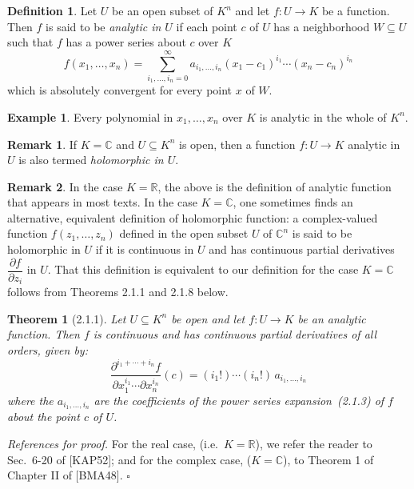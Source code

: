 \documentclass[11pt]{article}
\theoremstyle{plain}
\newtheorem*{theorem*}{Theorem}
\theoremstyle{definition}
\newtheorem*{definition}{Definition}
\newtheorem*{example}{Example}
\newtheorem*{remark}{Remark}
\newcommand{\R}{\mathbb{R}}
\newcommand{\C}{\mathbb{C}}
\begin{document}
\begin{definition}
Let $U$ be an open subset of $K^n$ and let $f: U \to K$ be a function.
Then $f$ is said to be \emph{analytic in $U$} if each point $c$ of $U$
has a neighborhood $W \subseteq U$ such that $f$ has a power series
about $c$ over $K$
\begin{equation}
f(x_1, \ldots, x_n) = \sum_{i_1, \ldots, i_n = 0}^{\infty}
a_{i_1, \ldots, i_n} (x_1 - c_1)^{i_1} \cdots (x_n - c_n)^{i_n}
\tag{2.1.3}
\end{equation}
which is absolutely convergent for every point $x$ of $W$.
\end{definition}

\begin{example}
Every polynomial in $x_1, \ldots, x_n$ over $K$ is analytic in the whole
of $K^n$.
\end{example}

\begin{remark}
If $K = \C$ and $U \subseteq K^n$ is open, then a function $f: U \to K$
analytic in $U$ is also termed \emph{holomorphic in $U$}.
\end{remark}

\begin{remark}
In the case $K = \R$, the above is the definition of analytic function
that appears in most texts. In the case $K = \C$, one sometimes finds an
alternative, equivalent definition of holomorphic function: a
complex-valued function $f(z_1, \ldots, z_n)$ defined in the open subset
$U$ of $\C^n$ is said to be holomorphic in $U$ if it is continuous in $U$
and has continuous partial derivatives $\dfrac{\partial f}{\partial z_i}$
in $U$. That this definition is equivalent to our definition for the
case $K = \C$ follows from Theorems 2.1.1 and 2.1.8 below.
\end{remark}

\begin{theorem*}[2.1.1]
Let $U \subseteq K^n$ be open and let $f: U \to K$ be an analytic
function. Then $f$ is continuous and has continuous partial derivatives
of all orders, given by:
\[
\frac{\partial^{i_1 + \cdots + i_n} f}
{\partial x_1^{i_1} \cdots \partial x_n^{i_n}}(c)
= (i_1!) \cdots (i_n!)\, a_{i_1, \ldots, i_n}
\]
where the $a_{i_1, \ldots, i_n}$ are the coefficients of the power series
expansion~(2.1.3) of $f$ about the point $c$ of $U$.
\end{theorem*}

\textit{References for proof.} For the real case, (i.e.\ $K = \R$), we
refer the reader to Sec.~6-20 of [KAP52]; and for the complex case,
($K = \C$), to Theorem 1 of Chapter II of [BMA48]. $\square$
\end{document}
